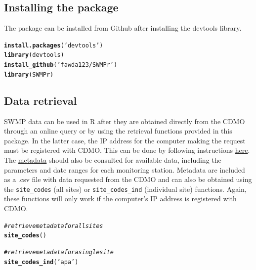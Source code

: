 \documentclass[10pt,letterpaper]{article}\usepackage[]{graphicx}\usepackage[]{color}
\makeatletter
\newcommand{\hlstr}[1]{\textcolor[rgb]{0.192,0.494,0.8}{#1}}%
\newcommand{\hlcom}[1]{\textcolor[rgb]{0.678,0.584,0.686}{\textit{#1}}}%
\newcommand{\hlstd}[1]{\textcolor[rgb]{0.345,0.345,0.345}{#1}}%
\newcommand{\hlkwd}[1]{\textcolor[rgb]{0.737,0.353,0.396}{\textbf{#1}}}%
\newenvironment{kframe}{%
 \def\at@end@of@kframe{}%
 \ifinner\ifhmode%
  \def\at@end@of@kframe{\end{minipage}}%
  \begin{minipage}{\columnwidth}%
 \fi\fi%
 \def\FrameCommand##1{\hskip\@totalleftmargin \hskip-\fboxsep
 \colorbox{shadecolor}{##1}\hskip-\fboxsep
     \hskip-\linewidth \hskip-\@totalleftmargin \hskip\columnwidth}%
 \MakeFramed {\advance\hsize-\width
   \@totalleftmargin\z@ \linewidth\hsize
   \@setminipage}}%
 {\par\unskip\endMakeFramed%
 \at@end@of@kframe}
\newenvironment{knitrout}{}{} %
\makeatother
\begin{document}
\subsection*{Installing the package}

The package can be installed from Github after installing the devtools library.

\begin{knitrout}
\color{fgcolor}\begin{kframe}
\begin{alltt}
\hlkwd{install.packages}\hlstd{(}\hlstr{'devtools'}\hlstd{)}
\hlkwd{library}\hlstd{(devtools)}
\hlkwd{install_github}\hlstd{(}\hlstr{'fawda123/SWMPr'}\hlstd{)}
\hlkwd{library}\hlstd{(SWMPr)}
\end{alltt}
\end{kframe}
\end{knitrout}


\subsection*{Data retrieval}

SWMP data can be used in R after they are obtained directly from the \ac{CDMO} through an online query or by using the retrieval functions provided in this package.  In the latter case, the IP address for the computer making the request must be registered with \ac{CDMO}.  This can be done by following instructions \href{http://cdmo.baruch.sc.edu/webservices.cfm}{here}.  The \href{http://cdmo.baruch.sc.edu/data/metadata.cfm}{metadata} should also be consulted for available data, including the parameters and date ranges for each monitoring station.  Metadata are included as a .csv file with data requested from the \ac{CDMO} and can also be obtained using the \texttt{site\_codes} (all sites) or \texttt{site\_codes\_ind} (individual site) functions.  Again, these functions will only work if the computer's IP address is registered with \ac{CDMO}. 

\begin{knitrout}
\color{fgcolor}\begin{kframe}
\begin{alltt}
\hlcom{# retrieve metadata for all sites}
\hlkwd{site_codes}\hlstd{()}

\hlcom{# retrieve metadata for a single site}
\hlkwd{site_codes_ind}\hlstd{(}\hlstr{'apa'}\hlstd{)}
\end{alltt}
\end{kframe}
\end{knitrout}
\end{document}
